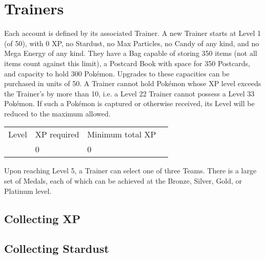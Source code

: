 \chapter{Trainers}
Each account is defined by its associated Trainer.
A new Trainer starts at Level 1 (of 50), with 0 XP, no Stardust, no Max Particles,
 no Candy of any kind, and no Mega Energy of any kind.
They have a Bag capable of storing 350 items (not all items count against this limit),
 a Postcard Book with space for 350 Postcards,
 and capacity to hold 300 Pokémon.
Upgrades to these capacities can be purchased in units of 50.
A Trainer cannot hold Pokémon whose XP level exceeds the Trainer's
 by more than 10, i.e. a Level 22 Trainer cannot possess a Level 33
 Pokémon. If such a Pokémon is captured or otherwise received, its
 Level will be reduced to the maximum allowed.

\begin{center}
\begin{tabular}{l l l l}
Level & XP required & Minimum total XP \\
\Midrule
1 & 0 & 0 \\
\end{tabular}
\end{center}

Upon reaching Level 5, a Trainer can select one of three Teams.
There is a large set of Medals, each of which can be achieved at the Bronze,
 Silver, Gold, or Platinum level.

\section{Collecting XP}

\section{Collecting Stardust}
